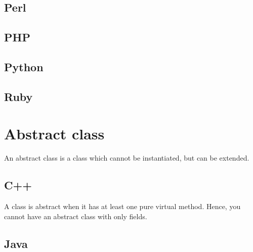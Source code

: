 \documentclass{KodeBook}
\begin{document}

\subsection{Perl}


\subsection{PHP}


\subsection{Python}


\subsection{Ruby}




\section{Abstract class}

An abstract class is a class which cannot be instantiated, but can be extended.


\subsection{C++}

A class is abstract when it has at least one pure virtual method. 
Hence, you cannot have an abstract class with only fields.


\subsection{Java}
\end{document}
